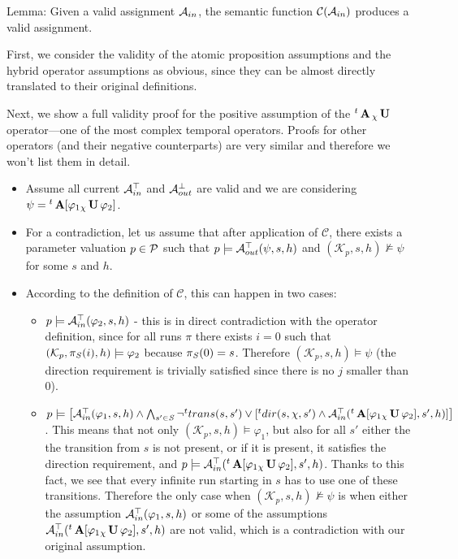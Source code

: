 Lemma: Given a valid assignment $\mathcal{A}_{in}$, the semantic function $\mathcal{C}(\mathcal{A}_{in})$ produces a valid assignment.

First, we consider the validity of the atomic proposition assumptions and the hybrid operator assumptions as obvious, since they can be almost directly translated to their original definitions.

Next, we show a full validity proof for the positive assumption of the ${}^{t}\operatorname{\mathbf{A}}{}_{\chi}\operatorname{\mathbf{U}}$ operator—one of the most complex temporal operators. Proofs for other operators (and their negative counterparts) are very similar and therefore we won't list them in detail.

\begin{itemize}
	\item Assume all current $\mathcal{A}^\top_{in}$ and $\mathcal{A}^\bot_{out}$ are valid and we are considering $ \psi = {}^{t} \operatorname{\mathbf{A}}[ \varphi_1 {}_{\chi}\operatorname{\mathbf{U}} \varphi_2 ]$.
	\item For a contradiction, let us assume that after application of $\mathcal{C}$, there exists a parameter valuation $p \in \mathcal{P}$ such that $p \models \mathcal{A}^\top_{out}(\psi, s, h)$ and $(\mathcal{K}_p, s, h) \not\models \psi$ for some $s$ and $h$.
	\item According to the definition of $\mathcal{C}$, this can happen in two cases:
	\begin{itemize}
		\item $p \models \mathcal{A}^\top_{in}(\varphi_2, s, h)$ - this is in direct contradiction with the operator definition, since for all runs $\pi$ there exists $i = 0$ such that $(\mathcal{K}_p, \pi_{\mathit{S}}(i), h) \models \varphi_2$ because $\pi_{\mathit{S}}(0) = s$. Therefore $(\mathcal{K}_p, s, h) \models \psi$ (the direction requirement is trivially satisfied since there is no $j$ smaller than $0$).
		\item $p \models \big[ \mathcal{A}^\top_{in}(\varphi_1, s, h) \land \bigwedge_{s' \in \mathit{S}} \neg{}^{t}trans(s,s') \lor [{}^{t}dir(s, \chi, s') \land \mathcal{A}^\top_{in}({}^{t}\operatorname{\mathbf{A}}[ \varphi_1 {}_{\chi}\operatorname{\mathbf{U}} \varphi_2], s', h)] \big]$. This means that not only $(\mathcal{K}_p, s, h) \models \varphi_1$, but also for all $s'$ either the the transition from $s$ is not present, or if it is present, it satisfies the direction requirement, and $p \models \mathcal{A}^\top_{in}({}^{t}\operatorname{\mathbf{A}}[ \varphi_1 {}_{\chi}\operatorname{\mathbf{U}} \varphi_2], s', h)$. Thanks to this fact, we see that every infinite run starting in $s$ has to use one of these transitions. Therefore the only case when $(\mathcal{K}_p, s, h) \not\models \psi$ is when either the assumption $\mathcal{A}^\top_{in}(\varphi_1, s, h)$ or some of the assumptions $\mathcal{A}^\top_{in}({}^{t}\operatorname{\mathbf{A}}[ \varphi_1 {}_{\chi}\operatorname{\mathbf{U}} \varphi_2], s', h)$ are not valid, which is a contradiction with our original assumption.
	\end{itemize}
\end{itemize}

